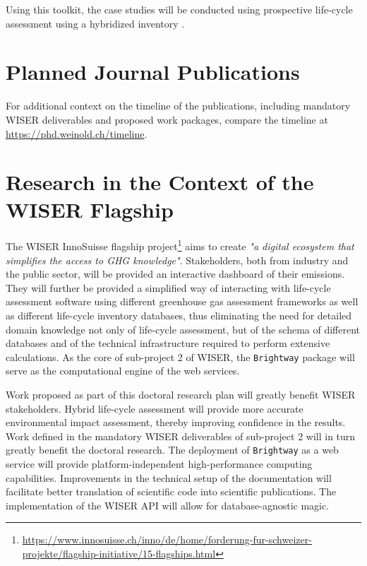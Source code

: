 \documentclass{article}
\begin{document}
    Using this toolkit, the case studies will be conducted using prospective \cite{sacchi_prospective_2022} life-cycle assessment using a hybridized inventory \cite{crawford_hybrid_2018}.


\section{Planned Journal Publications}

    For additional context on the timeline of the publications, including mandatory WISER deliverables and proposed work packages, compare the timeline at \url{https://phd.weinold.ch/timeline}.
    
\section{Research in the Context of the WISER Flagship}
    
    The WISER InnoSuisse flagship project\footnote{\url{https://www.innosuisse.ch/inno/de/home/forderung-fur-schweizer-projekte/flagship-initiative/15-flagships.html}} aims to create \textit{"a digital ecosystem that simplifies the access to GHG knowledge"}. Stakeholders, both from industry and the public sector, will be provided an interactive dashboard of their emissions. They will further be provided a simplified way of interacting with life-cycle assessment software using different greenhouse gas assessment frameworks as well as different life-cycle inventory databases, thus eliminating the need for detailed domain knowledge not only of life-cycle assessment, but of the schema of different databases and of the technical infrastructure required to perform extensive calculations. As the core of sub-project 2 of WISER, the \texttt{Brightway} package will serve as the computational engine of the web services.
    
    Work proposed as part of this doctoral research plan will greatly benefit WISER stakeholders. Hybrid life-cycle assessment will provide more accurate environmental impact assessment, thereby improving confidence in the results. Work defined in the mandatory WISER deliverables of sub-project 2 will in turn greatly benefit the doctoral research. The deployment of \texttt{Brightway} as a web service will provide platform-independent high-performance computing capabilities. Improvements in the technical setup of the documentation will facilitate better translation of scientific code into scientific publications. The implementation of the WISER API will allow for database-agnostic magic.
    
\end{document}
